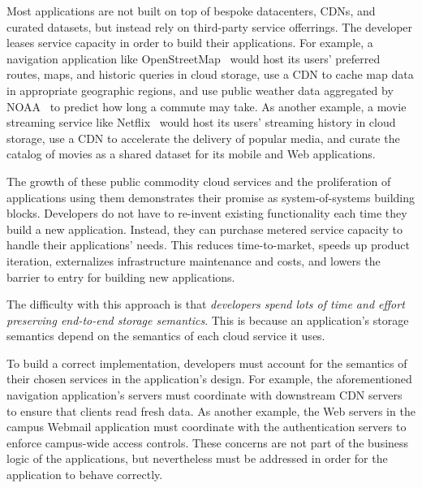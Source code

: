 Most applications are not built on top of bespoke datacenters, CDNs, and curated
datasets, but instead rely on third-party service offerrings.  The developer
leases service capacity in order to build their applications.
For example, a navigation application like OpenStreetMap~\cite{openstreetmap}
would host its users' preferred routes, maps, and historic queries in cloud storage,
use a CDN to cache map data in appropriate geographic regions,
and use public weather data aggregated by NOAA~\cite{noaa} to predict how long a commute may take.
As another example, a movie streaming service like Netflix~\cite{netflix} would
host its users' streaming history in cloud storage, use a CDN to accelerate the
delivery of popular media, and curate the catalog of movies as a shared dataset
for its mobile and Web applications.



The growth of these public commodity cloud services and the proliferation of
applications using them demonstrates their promise as system-of-systems
building blocks.  Developers do not have to re-invent existing functionality
each time they build a new application.  Instead, they can
purchase metered service capacity to handle their applications' needs.
This reduces time-to-market, speeds up product iteration, externalizes
infrastructure maintenance and costs,
and lowers the barrier to entry for building new applications.

The difficulty with this approach is that \emph{developers spend lots of
time and effort preserving end-to-end storage semantics}.  This is because an application's
storage semantics depend on the semantics of each cloud service it uses.

To build a correct implementation, developers must account for
the semantics of their chosen services in the application's design.
For example, the aforementioned navigation application's servers
must coordinate with downstream CDN servers to ensure that
clients read fresh data.  As another example, the Web servers in the
campus Webmail application must coordinate with 
the authentication servers to enforce campus-wide access controls.
These concerns are not part of the business logic of the applications, but 
nevertheless must be addressed in order for the application to behave correctly.

